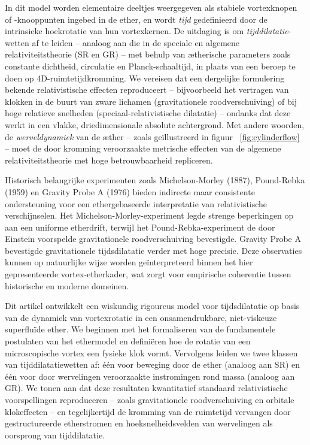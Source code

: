 In dit model worden elementaire deeltjes weergegeven als stabiele vortexknopen of -knooppunten ingebed in de ether, en wordt \emph{tijd} gedefinieerd door de intrinsieke hoekrotatie van hun vortexkernen. De uitdaging is om \emph{tijddilatatie}-wetten af te leiden – analoog aan die in de speciale en algemene relativiteitstheorie (SR en GR) – met behulp van ætherische parameters zoals constante dichtheid, circulatie en Planck-schaaltijd, in plaats van een beroep te doen op 4D-ruimtetijdkromming. We vereisen dat een dergelijke formulering bekende relativistische effecten reproduceert – bijvoorbeeld het vertragen van klokken in de buurt van zware lichamen (gravitationele roodverschuiving) of bij hoge relatieve snelheden (speciaal-relativistische dilatatie) – ondanks dat deze werkt in een vlakke, driedimensionale absolute achtergrond. Met andere woorden, de \emph{werveldynamiek} van de æther – zoals geïllustreerd in figuur ~\ref{fig:cylinderflow} – moet de door kromming veroorzaakte metrische effecten van de algemene relativiteitstheorie met hoge betrouwbaarheid repliceren.

Historisch belangrijke experimenten zoals Michelson-Morley (1887), Pound-Rebka (1959) en Gravity Probe A (1976) bieden indirecte maar consistente ondersteuning voor een ethergebaseerde interpretatie van relativistische verschijnselen. Het Michelson-Morley-experiment legde strenge beperkingen op aan een uniforme etherdrift, terwijl het Pound-Rebka-experiment de door Einstein voorspelde gravitationele roodverschuiving bevestigde. Gravity Probe A bevestigde gravitationele tijdsdilatatie verder met hoge precisie. Deze observaties kunnen op natuurlijke wijze worden geïnterpreteerd binnen het hier gepresenteerde vortex-etherkader, wat zorgt voor empirische coherentie tussen historische en moderne domeinen.

Dit artikel ontwikkelt een wiskundig rigoureus model voor tijdsdilatatie op basis van de dynamiek van vortexrotatie in een onsamendrukbare, niet-viskeuze superfluïde ether. We beginnen met het formaliseren van de fundamentele postulaten van het ethermodel en definiëren hoe de rotatie van een microscopische vortex een fysieke klok vormt. Vervolgens leiden we twee klassen van tijddilatatiewetten af: één voor beweging door de ether (analoog aan SR) en één voor door wervelingen veroorzaakte instromingen rond massa (analoog aan GR). We tonen aan dat deze resultaten kwantitatief standaard relativistische voorspellingen reproduceren – zoals gravitationele roodverschuiving en orbitale klokeffecten – en tegelijkertijd de kromming van de ruimtetijd vervangen door gestructureerde etherstromen en hoeksnelheidsvelden van wervelingen als oorsprong van tijddilatatie.